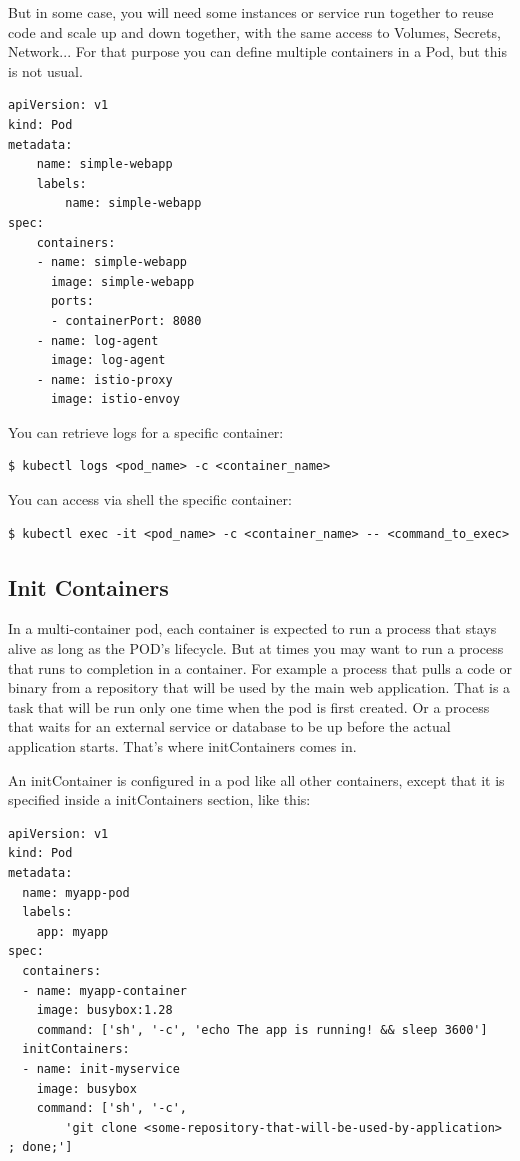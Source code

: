 \documentclass{article}
\newenvironment{codetemplate}[1][]{%
  \mybasecolorbox[#1]
  \itshape
}{%
  \endmybasecolorbox
}
\begin{document}
But in some case, you will need some instances or service run together to reuse code and scale up and down together, with the same access to Volumes, Secrets, Network... For that purpose you can define multiple containers in a Pod, but this is not usual.

\begin{codetemplate}{}
\begin{verbatim}
apiVersion: v1
kind: Pod
metadata:
    name: simple-webapp
    labels:
        name: simple-webapp
spec:
    containers:
    - name: simple-webapp
      image: simple-webapp
      ports:
      - containerPort: 8080
    - name: log-agent
      image: log-agent
    - name: istio-proxy
      image: istio-envoy
\end{verbatim}
\end{codetemplate}

You can retrieve logs for a specific container:
\begin{codetemplate}{}
\begin{verbatim}
$ kubectl logs <pod_name> -c <container_name>
\end{verbatim}
\end{codetemplate}

You can access via shell the specific container:
\begin{codetemplate}{}
\begin{verbatim}
$ kubectl exec -it <pod_name> -c <container_name> -- <command_to_exec>
\end{verbatim}
\end{codetemplate}

\subsection{Init Containers}
In a multi-container pod, each container is expected to run a process that stays alive as long as the POD's lifecycle. But at times you may want to run a process that runs to completion in a container. For example a process that pulls a code or binary from a repository that will be used by the main web application. That is a task that will be run only  one time when the pod is first created. Or a process that waits  for an external service or database to be up before the actual application starts. That's where initContainers comes in.

An initContainer is configured in a pod like all other containers, except that it is specified inside a initContainers section,  like this:

\begin{codetemplate}{}
\begin{verbatim}
apiVersion: v1
kind: Pod
metadata:
  name: myapp-pod
  labels:
    app: myapp
spec:
  containers:
  - name: myapp-container
    image: busybox:1.28
    command: ['sh', '-c', 'echo The app is running! && sleep 3600']
  initContainers:
  - name: init-myservice
    image: busybox
    command: ['sh', '-c', 
        'git clone <some-repository-that-will-be-used-by-application> ; done;']
\end{verbatim}
\end{codetemplate}
\end{document}
